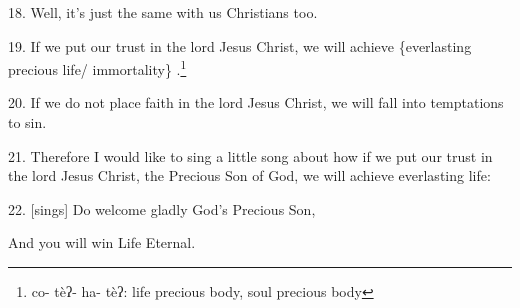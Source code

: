18. Well, it's just the same with us Christians too.

19. If we put our trust in the lord Jesus Christ, we will achieve \{everlasting
precious life/ immortality\} .\footnote{co-  tèʔ-  ha-  tèʔ:  life  precious body, soul precious body}

20. If we do not place faith in the lord Jesus Christ, we will fall into temptations
to sin.

21. Therefore I would like to sing a little song about how if we put our trust
in the lord Jesus Christ, the Precious Son of God, we will achieve everlasting
life:

22. [sings] Do welcome gladly God's Precious Son,

And you will win Life Eternal.


